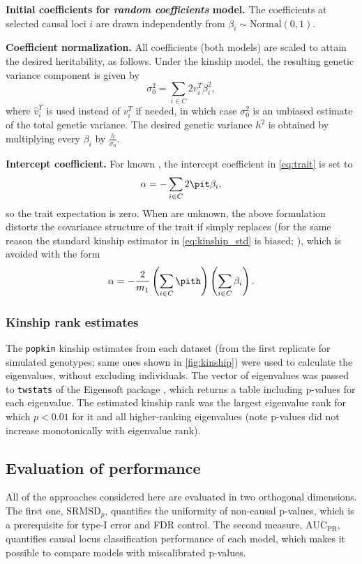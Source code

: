 \documentclass[11pt]{article}
\newcommand{\rmsd}{\text{SRMSD}_p}
\newcommand{\auc}{\text{AUC}_\text{PR}}
\begin{document}
\textbf{Initial coefficients for \textit{random coefficients} model.}
The coefficients at selected causal loci $i$ are drawn independently from $\beta_i \sim \text{Normal}( 0, 1 )$.

\textbf{Coefficient normalization.}
All coefficients (both models) are scaled to attain the desired heritability, as follows.
Under the kinship model, the resulting genetic variance component is given by
$$
\sigma^2_0
=
\sum_{i \in C} 2 v_i^T \beta_i^2 ,
$$
where $\hat{v}_i^T$ is used instead of $v_i^T$ if needed, in which case $\sigma^2_0$ is an unbiased estimate of the total genetic variance.
The desired genetic variance $h^2$ is obtained by multiplying every $\beta_i$ by $\frac{h}{ \sigma_0 }$.

\textbf{Intercept coefficient.}
For known \pit, the intercept coefficient in \cref{eq:trait} is set to
$$
\alpha = - \sum_{i \in C} 2 \pit \beta_i,
$$
so the trait expectation is zero.
When \pit are unknown, the above formulation distorts the covariance structure of the trait if \pith simply replaces \pit (for the same reason the standard kinship estimator in \cref{eq:kinship_std} is biased; \cite{ochoa_estimating_2021}), which is avoided with the form
$$
\alpha = - \frac{2}{m_1} \left( \sum_{i \in C} \pith \right) \left(\sum_{i \in C} \beta_i \right).
$$

\subsubsection{Kinship rank estimates}

The \texttt{popkin} kinship estimates from each dataset (from the first replicate for simulated genotypes; same ones shown in \cref{fig:kinship}) were used to calculate the eigenvalues, without excluding individuals.
The vector of eigenvalues was passed to \texttt{twstats} of the Eigensoft package \citep{patterson_population_2006}, which returns a table including p-values for each eigenvalue.
The estimated kinship rank was the largest eigenvalue rank for which $p < 0.01$ for it and all higher-ranking eigenvalues (note p-values did not increase monotonically with eigenvalue rank).

\subsection{Evaluation of performance}

All of the approaches considered here are evaluated in two orthogonal dimensions.
The first one, $\rmsd$, quantifies the uniformity of non-causal p-values, which is a prerequisite for type-I error and FDR control.
The second measure, $\auc$, quantifies causal locus classification performance of each model, which makes it possible to compare models with miscalibrated p-values.
\end{document}
